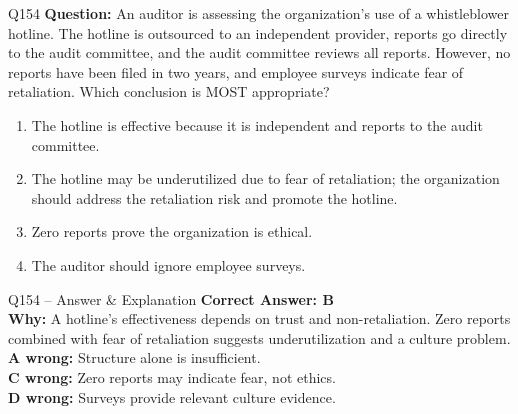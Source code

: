\documentclass[aspectratio=169,10pt]{beamer}
\begin{document}
	\begin{frame}[t]{Q154}
		\small
		\textbf{Question:} An auditor is assessing the organization's use of a whistleblower hotline. The hotline is outsourced to an independent provider, reports go directly to the audit committee, and the audit committee reviews all reports. However, no reports have been filed in two years, and employee surveys indicate fear of retaliation. Which conclusion is MOST appropriate?
		\begin{enumerate}[label=\Alph*.,itemsep=1pt,topsep=2pt]
			\item The hotline is effective because it is independent and reports to the audit committee.
			\item The hotline may be underutilized due to fear of retaliation; the organization should address the retaliation risk and promote the hotline.
			\item Zero reports prove the organization is ethical.
			\item The auditor should ignore employee surveys.
		\end{enumerate}
	\end{frame}
	
	\begin{frame}[t]{Q154 -- Answer \& Explanation}
		\small
		\textbf{Correct Answer: B} \\[4pt]
		\textbf{Why:} A hotline's effectiveness depends on trust and non-retaliation. Zero reports combined with fear of retaliation suggests underutilization and a culture problem. \\[4pt]
		\textbf{A wrong:} Structure alone is insufficient. \\[2pt]
		\textbf{C wrong:} Zero reports may indicate fear, not ethics. \\[2pt]
		\textbf{D wrong:} Surveys provide relevant culture evidence.
	\end{frame}
	
\end{document}
